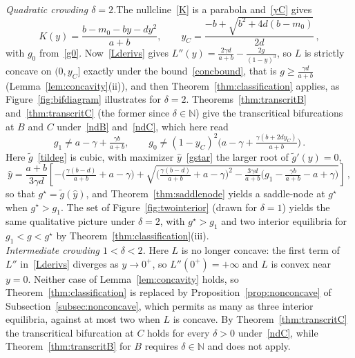 \documentclass[reqno,11pt]{amsart}
\numberwithin{equation}{section}
\newcommand{\N}{\mathbb{N}}
\begin{document}
\noindent\emph{Quadratic crowding $\delta=2$.}\quad The nullcline~\eqref{K} is a parabola and~\eqref{yC} gives
\[
K(y)=\frac{b-m_0-by-dy^2}{a+b},\qquad y_C=\frac{-b+\sqrt{b^2+4d(b-m_0)}}{2d}\,,
\]
with $g_0$ from~\eqref{g0}. Now~\eqref{Lderivs} gives $L''(y)=\tfrac{2\gamma d}{a+b}-\tfrac{2g}{(1-y)^3}$, so $L$ is strictly concave on $(0,y_C]$ exactly under the bound~\eqref{concbound}, that is $g\ge\tfrac{\gamma d}{a+b}$ (Lemma~\ref{lem:concavity}(ii)), and then Theorem~\ref{thm:classification} applies, as Figure~\ref{fig:bifdiagram} illustrates for $\delta=2$. Theorems~\ref{thm:transcritB} and~\ref{thm:transcritC} (the former since $\delta\in\N$) give the transcritical bifurcations at $B$ and $C$ under~\eqref{ndB} and~\eqref{ndC}, which here read
\[
g_1\neq a-\gamma+\tfrac{\gamma b}{a+b},\qquad
g_0\neq(1-y_C)^2\Big(a-\gamma+\tfrac{\gamma(b+2d y_C)}{a+b}\Big)\,.
\]
Here $\tilde g$~\eqref{tildeg} is cubic, with maximizer $\hat y$~\eqref{gstar} the larger root of $\tilde g'(y)=0$,
\[
\hat y=\frac{a+b}{3\gamma d}\left[-\Big(\tfrac{\gamma(b-d)}{a+b}+a-\gamma\Big)
+\sqrt{\Big(\tfrac{\gamma(b-d)}{a+b}+a-\gamma\Big)^{2}-\tfrac{3\gamma d}{a+b}\Big(g_1-\tfrac{\gamma b}{a+b}-a+\gamma\Big)}\right]\,,
\]
so that $g^\star=\tilde g(\hat y)$, and Theorem~\ref{thm:saddlenode} yields a saddle-node at $g^\star$ when $g^\star>g_1$. The set of Figure~\ref{fig:twointerior} (drawn for $\delta=1$) yields the same qualitative picture under $\delta=2$, with $g^\star>g_1$ and two interior equilibria for $g_1<g<g^\star$ by Theorem~\ref{thm:classification}(iii). \\


\noindent\emph{Intermediate crowding $1<\delta<2$.}\quad 
Here $L$ is no longer concave: the first term of $L''$ in~\eqref{Lderivs} diverges as $y\to0^+$, 
so $L''(0^+)=+\infty$ and $L$ is convex near $y=0$. Neither case of Lemma~\ref{lem:concavity} holds, so Theorem~\ref{thm:classification} is replaced by Proposition~\ref{prop:nonconcave} of Subsection~\ref{subsec:nonconcave}, which permits as many as three interior equilibria, against at most two when $L$ is concave. By Theorem~\ref{thm:transcritC} the transcritical bifurcation at $C$ holds for every $\delta>0$ under~\eqref{ndC}, while Theorem~\ref{thm:transcritB} for $B$ requires $\delta\in\N$ and does not apply.
\end{document}
